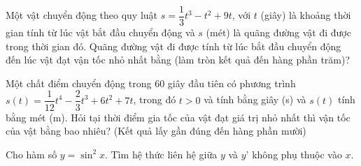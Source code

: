 \begin{bt}%

Một vật chuyển động theo quy luật $s=\dfrac{1}{3} t^3-t^2+9t$, với $t$ (giây) là khoảng thời gian tính từ lúc vật bắt đầu chuyển động và $s$ (mét) là quãng đường vật đi được trong thời gian đó. Quãng đường vật đi được tính từ lúc bắt đầu chuyển động đến lúc vật đạt vận tốc nhỏ nhất bằng (làm tròn kết quả đến hàng phần trăm)?
\end{bt}

\begin{bt}%

Một chất điểm chuyển động trong 60 giây đầu tiên có phương trình $s(t)=\dfrac{1}{12}t^4-\dfrac{2}{3}t^3+6t^2+7t$, trong đó $t>0$ và tính bằng giây (s) và $s(t)$ tính bằng mét (m). Hỏi tại thời điểm gia tốc của vật đạt giá trị nhỏ nhất thì vận tốc của vật bằng bao nhiêu? (Kết quả lấy gần đúng đến hàng phần mười)
\end{bt}

\begin{bt}%

	Cho hàm số $y = \sin ^2 x$. Tìm hệ thức liên hệ giữa $y$ và $y’$ không phụ thuộc vào $x$.
\end{bt}

